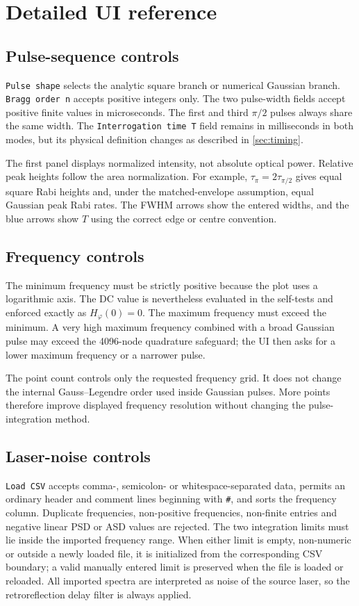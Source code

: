\documentclass[11pt,a4paper]{article}
\newcommand{\Hphi}{H_{\varphi}}
\newcommand{\tauhalf}{\tau_{\pi/2}}
\newcommand{\taupi}{\tau_{\pi}}
\begin{document}
\section{Detailed UI reference}

\subsection{Pulse-sequence controls}

\texttt{Pulse shape} selects the analytic square branch or numerical Gaussian branch. \texttt{Bragg order n} accepts positive integers only. The two pulse-width fields accept positive finite values in microseconds. The first and third $\pi/2$ pulses always share the same width. The \texttt{Interrogation time T} field remains in milliseconds in both modes, but its physical definition changes as described in \cref{sec:timing}.

The first panel displays normalized intensity, not absolute optical power. Relative peak heights follow the area normalization. For example, $\taupi=2\tauhalf$ gives equal square Rabi heights and, under the matched-envelope assumption, equal Gaussian peak Rabi rates. The FWHM arrows show the entered widths, and the blue arrows show $T$ using the correct edge or centre convention.

\subsection{Frequency controls}

The minimum frequency must be strictly positive because the plot uses a logarithmic axis. The DC value is nevertheless evaluated in the self-tests and enforced exactly as $\Hphi(0)=0$. The maximum frequency must exceed the minimum. A very high maximum frequency combined with a broad Gaussian pulse may exceed the 4096-node quadrature safeguard; the UI then asks for a lower maximum frequency or a narrower pulse.

The point count controls only the requested frequency grid. It does not change the internal Gauss--Legendre order used inside Gaussian pulses. More points therefore improve displayed frequency resolution without changing the pulse-integration method.

\subsection{Laser-noise controls}

\texttt{Load CSV} accepts comma-, semicolon- or whitespace-separated data, permits an ordinary header and comment lines beginning with \texttt{\#}, and sorts the frequency column. Duplicate frequencies, non-positive frequencies, non-finite entries and negative linear PSD or ASD values are rejected. The two integration limits must lie inside the imported frequency range. When either limit is empty, non-numeric or outside a newly loaded file, it is initialized from the corresponding CSV boundary; a valid manually entered limit is preserved when the file is loaded or reloaded. All imported spectra are interpreted as noise of the source laser, so the retroreflection delay filter is always applied.
\end{document}
